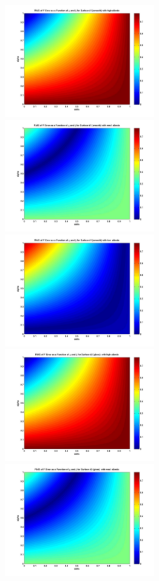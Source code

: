 \begin{description}
  \begin{figure}[!ht]
  \leftskip=-20mm
  \begin{minipage}[t]{200mm}\centering
    \includegraphics[width=65mm]{figs/sda/F_error_albedo_high_surf_smooth.jpg}
    \includegraphics[width=65mm]{figs/sda/F_error_albedo__med_surf_smooth.jpg}
    \includegraphics[width=65mm]{figs/sda/F_error_albedo__low_surf_smooth.jpg}
    \includegraphics[width=65mm]{figs/sda/F_error_albedo_high_surf__gloss.jpg}
    \includegraphics[width=65mm]{figs/sda/F_error_albedo__med_surf__gloss.jpg}

\end{minipage}
\end{figure}
\end{description}

